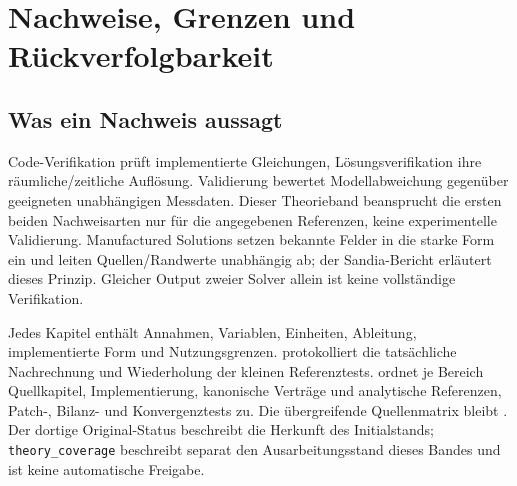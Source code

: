\chapter{Nachweise, Grenzen und Rückverfolgbarkeit}\label{chap:evidence}
\section{Was ein Nachweis aussagt}
Code-Verifikation prüft implementierte Gleichungen, Lösungsverifikation ihre
räumliche/zeitliche Auflösung. Validierung bewertet Modellabweichung gegenüber
geeigneten unabhängigen Messdaten. Dieser Theorieband beansprucht die ersten
beiden Nachweisarten nur für die angegebenen Referenzen, keine experimentelle
Validierung. Manufactured Solutions setzen bekannte Felder in die starke Form
ein und leiten Quellen/Randwerte unabhängig ab; der Sandia-Bericht
\cite{sandia-mms} erläutert dieses Prinzip. Gleicher Output zweier Solver allein
ist keine vollständige Verifikation.

Jedes Kapitel enthält Annahmen, Variablen, Einheiten, Ableitung, implementierte
Form und Nutzungsgrenzen.  protokolliert
die tatsächliche Nachrechnung und Wiederholung der kleinen Referenztests.
 ordnet je Bereich Quellkapitel,
Implementierung, kanonische Verträge und analytische Referenzen, Patch-, Bilanz- und
Konvergenztests zu. Die übergreifende Quellenmatrix bleibt
. Der dortige Original-Status beschreibt die
Herkunft des Initialstands; \texttt{theory\_\allowbreak coverage} beschreibt separat den
Ausarbeitungsstand dieses Bandes und ist keine automatische Freigabe.

